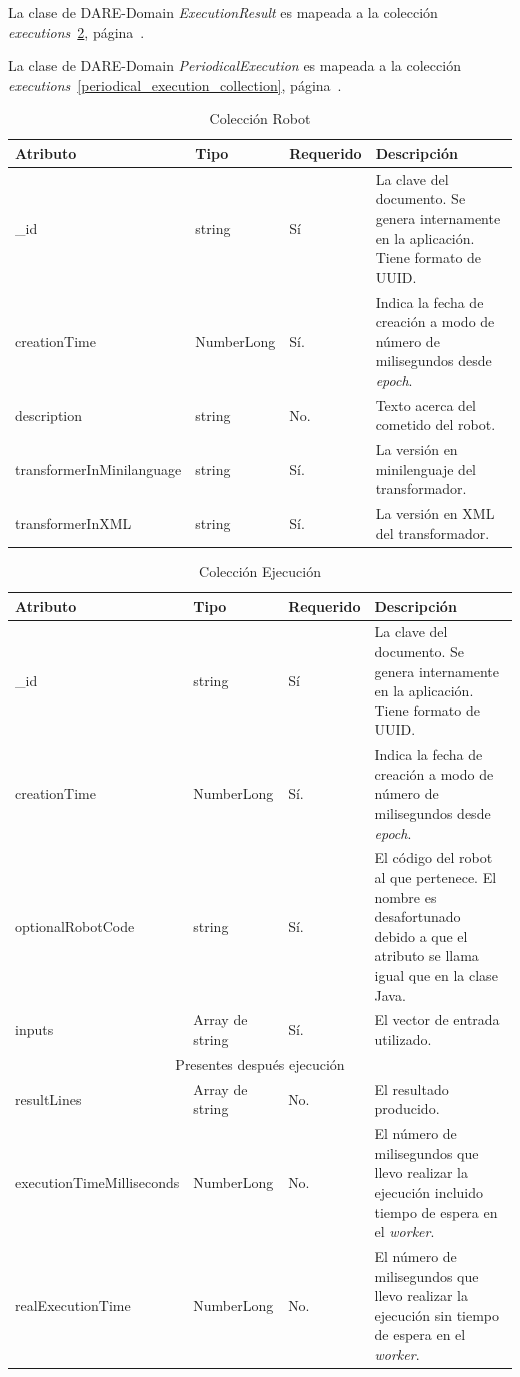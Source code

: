 La clase de DARE-Domain \emph{ExecutionResult} es mapeada a la
colección \emph{executions}~\ref{execution_collection},
página~\pageref{execution_collection}.

La clase de DARE-Domain \emph{PeriodicalExecution} es mapeada a la
colección \emph{executions}~\ref{periodical_execution_collection},
página~\pageref{periodical_execution_collection}.

\begin{table}[hbp]
\begin{tabularx}{\textwidth}{|l|l|l|X|}
\hline
Atributo & Tipo & Requerido & Descripción \\ \hline
\_id & string & Sí & La clave del documento. Se genera internamente en la
aplicación. Tiene formato de UUID. \\ \hline
creationTime & NumberLong & Sí. & Indica la fecha de creación a modo de
número de milisegundos desde \emph{epoch}. \\ \hline
description & string & No. & Texto acerca del cometido del
robot. \\ \hline
transformerInMinilanguage & string & Sí. & La versión en minilenguaje
del transformador. \\ \hline
transformerInXML & string & Sí. & La versión en XML del transformador. \\ \hline
\end{tabularx}
\caption{Colección Robot}
\label{robot_collection}
\end{table}

\begin{table}[hbp]
\begin{tabularx}{\textwidth}{|l|l|l|X|}
\hline
Atributo & Tipo & Requerido & Descripción \\ \hline
\_id & string & Sí & La clave del documento. Se genera internamente en la
aplicación. Tiene formato de UUID. \\ \hline
creationTime & NumberLong & Sí. & Indica la fecha de creación a modo de
número de milisegundos desde \emph{epoch}. \\ \hline
optionalRobotCode & string & Sí. & El código del robot al que
pertenece. El nombre es desafortunado debido a que el atributo se
llama igual que en la clase Java.\\ \hline
inputs & Array de string & Sí. & El vector de entrada
utilizado. \\ \hline
\multicolumn{4}{c}{Presentes después ejecución} \\ \hline
resultLines & Array de string & No. & El resultado
producido. \\ \hline
executionTimeMilliseconds & NumberLong & No. & El número de
milisegundos que llevo realizar la ejecución incluido tiempo de espera
en el \emph{worker}. \\ \hline
realExecutionTime & NumberLong & No. & El número de
milisegundos que llevo realizar la ejecución sin tiempo de espera
en el \emph{worker}. \\ \hline
\end{tabularx}
\caption{Colección Ejecución}
\label{execution_collection}
\end{table}

